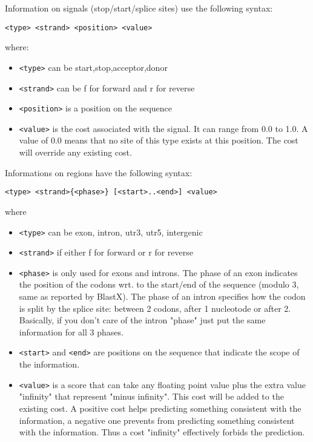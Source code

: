 \documentclass[a4paper,titlepage]{report}
\begin{document}
\begin{itemize}
  Information on signals (stop/start/splice sites) use the
  following syntax:
  \begin{Verbatim}[fontsize=\small]
  <type> <strand> <position> <value>
\end{Verbatim}
  where:
  \begin{itemize}
  \item \verb|<type>| can be start,stop,acceptor,donor 
  \item \verb|<strand>| can be f for forward and r for reverse
  \item \verb|<position>| is a position on the sequence 
  \item \verb|<value>| is the cost associated with the signal. It can range
    from 0.0 to 1.0. A value of 0.0 means that no site of this type
    exists at this position.  The cost will override any existing
    cost.
  \end{itemize} 
  
Informations on regions have the following syntax:
  \begin{Verbatim}[fontsize=\small]
         <type> <strand>{<phase>} [<start>..<end>] <value>
\end{Verbatim}
where
\begin{itemize}
\item \verb|<type>| can be exon, intron, utr3, utr5, intergenic
\item \verb|<strand>| if either f for forward or r for reverse

\item \verb|<phase>| is only used for exons and introns. The phase of an
  exon indicates the position of the codons wrt. to the
  start/end of the sequence (modulo 3, same as reported by
  BlastX). The phase of an intron specifies how the codon is
  split by the splice site: between 2 codons, after 1
  nucleotode or after 2. Basically, if you don't care of the
  intron "phase" just put the same information for all 3
  phases.
  
\item \verb|<start>| and \verb|<end>| are positions on the sequence that
  indicate the scope of the information.
  
\item \verb|<value>| is a score that can take any floating point value
  plus the extra value "infinity" that represent "minus
  infinity". This cost will be added to the existing cost.  A
  positive cost helps predicting something consistent with the
  information, a negative one prevents from predicting
  something consistent with the information. Thus a cost
  "infinity" effectively forbids the prediction.
\end{itemize}


\end{itemize}
\end{document}
